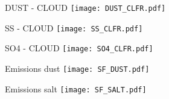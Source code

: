 \documentclass{beamer}
\begin{document}

\begin{frame}{DUST - CLOUD}
\texttt{[image: DUST\_CLFR.pdf]} 
\end{frame}


\begin{frame}{SS - CLOUD}
\texttt{[image: SS\_CLFR.pdf]} 
\end{frame}

\begin{frame}{SO4 - CLOUD}
\texttt{[image: SO4\_CLFR.pdf]} 
\end{frame}


\begin{frame}{Emissions dust }
\texttt{[image: SF\_DUST.pdf]} 
\end{frame}
\begin{frame}{Emissions salt }
\texttt{[image: SF\_SALT.pdf]} 
\end{frame}
\end{document}

